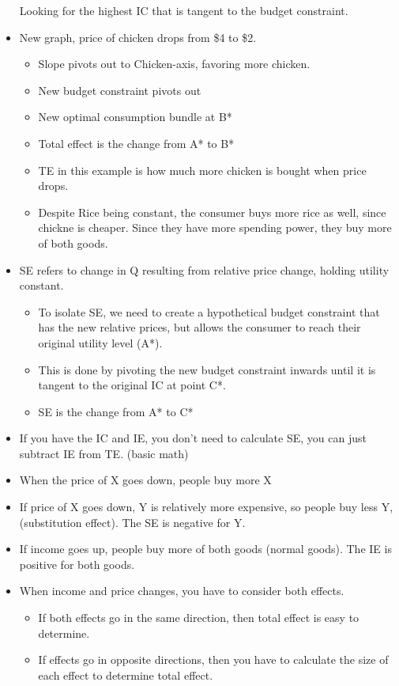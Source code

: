 \documentclass{article}
\begin{document}
\begin{itemize}
    Looking for the highest IC that is tangent to the budget constraint.
  \item New graph, price of chicken drops from \$4 to \$2.
    \begin{itemize}
      \item Slope pivots out to Chicken-axis, favoring more chicken.
      \item New budget constraint pivots out
      \item New optimal consumption bundle at B*
      \item Total effect is the change from A* to B*
      \item TE in this example is how much more chicken is bought when price drops.
      \item Despite Rice being constant, the consumer buys more rice as well, since
        chickne is cheaper. Since they have more spending power, they buy more of both goods.
    \end{itemize}
  \item SE refers to change in Q resulting from relative price change, holding utility constant.
    \begin{itemize}
      \item To isolate SE, we need to create a hypothetical budget constraint
        that has the new relative prices, but allows the consumer to reach
        their original utility level (A*).
      \item This is done by pivoting the new budget constraint inwards
        until it is tangent to the original IC at point C*.
      \item SE is the change from A* to C*
    \end{itemize}
  \item If you have the IC and IE, you don't need to calculate SE, you can just subtract IE from TE. (basic math)
  \item When the price of X goes down, people buy more X
  \item If price of X goes down, Y is relatively more expensive, so people buy less Y, (substitution effect).
    The SE is negative for Y.
  \item If income goes up, people buy more of both goods (normal goods).
    The IE is positive for both goods.
  \item When income and price changes, you have to consider both effects.
    \begin{itemize}
      \item If both effects go in the same direction, then total effect is easy to determine.
      \item If effects go in opposite directions, then you have to calculate the size of each effect to determine total effect.
    \end{itemize}


\end{itemize}
\end{document}
